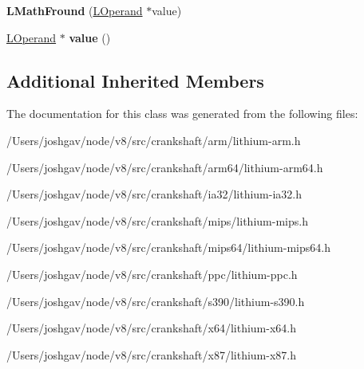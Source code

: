 \begin{DoxyCompactItemize}
\item 
{\bfseries L\+Math\+Fround} (\hyperlink{classv8_1_1internal_1_1_l_operand}{L\+Operand} $\ast$value)\hypertarget{classv8_1_1internal_1_1_l_math_fround_ae2ec34c71040c44116eb335667986836}{}\label{classv8_1_1internal_1_1_l_math_fround_ae2ec34c71040c44116eb335667986836}

\item 
\hyperlink{classv8_1_1internal_1_1_l_operand}{L\+Operand} $\ast$ {\bfseries value} ()\hypertarget{classv8_1_1internal_1_1_l_math_fround_a74cff6e303103b689c0a4368631b8443}{}\label{classv8_1_1internal_1_1_l_math_fround_a74cff6e303103b689c0a4368631b8443}

\end{DoxyCompactItemize}
\subsection*{Additional Inherited Members}


The documentation for this class was generated from the following files\+:\begin{DoxyCompactItemize}
\item 
/\+Users/joshgav/node/v8/src/crankshaft/arm/lithium-\/arm.\+h\item 
/\+Users/joshgav/node/v8/src/crankshaft/arm64/lithium-\/arm64.\+h\item 
/\+Users/joshgav/node/v8/src/crankshaft/ia32/lithium-\/ia32.\+h\item 
/\+Users/joshgav/node/v8/src/crankshaft/mips/lithium-\/mips.\+h\item 
/\+Users/joshgav/node/v8/src/crankshaft/mips64/lithium-\/mips64.\+h\item 
/\+Users/joshgav/node/v8/src/crankshaft/ppc/lithium-\/ppc.\+h\item 
/\+Users/joshgav/node/v8/src/crankshaft/s390/lithium-\/s390.\+h\item 
/\+Users/joshgav/node/v8/src/crankshaft/x64/lithium-\/x64.\+h\item 
/\+Users/joshgav/node/v8/src/crankshaft/x87/lithium-\/x87.\+h\end{DoxyCompactItemize}
